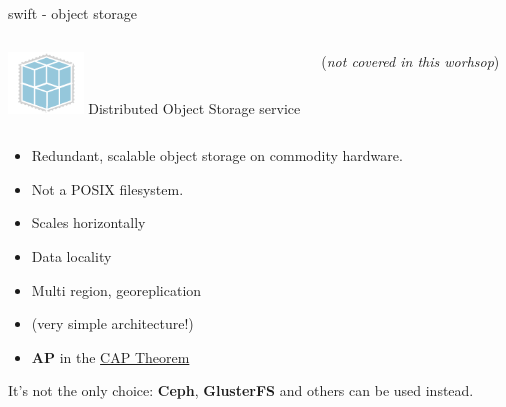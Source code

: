 \documentclass[english,serif,mathserif,usenames,dvipsnames]{beamer}
\begin{document}
\begin{frame}
  {swift - object storage}
  \begin{columns}
    \column{2cm}
    \includegraphics[width=2cm]{openstack-object-storage-icon.png}
    \column{8cm}
    Distributed Object Storage service
    
    (\textit{not covered in this worhsop})
  \end{columns}
  
  \+\+
  \begin{itemize}
  \item Redundant, scalable object storage on commodity hardware.
  \item Not a POSIX filesystem.
  \item Scales horizontally
  \item Data locality
  \item Multi region, georeplication
  \item (very simple architecture!)
  \item \textbf{AP} in the
    \href{https://en.wikipedia.org/wiki/CAP_theorem}{CAP Theorem}
  \end{itemize}

  \+ It's not the only choice: \textbf{Ceph}, \textbf{GlusterFS} and
  others can be used instead.

\end{frame}
\end{document}
